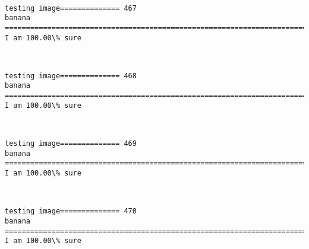 \documentclass[11pt]{article}
\begin{document}
    \begin{center}
    \end{center}
    { \hspace*{\fill} \\}
    
    \begin{Verbatim}[commandchars=\\\{\}]
testing image============== 467
banana
============================================================================
I am 100.00\% sure

    \end{Verbatim}

    \begin{center}
    \end{center}
    { \hspace*{\fill} \\}
    
    \begin{Verbatim}[commandchars=\\\{\}]
testing image============== 468
banana
============================================================================
I am 100.00\% sure

    \end{Verbatim}

    \begin{center}
    \end{center}
    { \hspace*{\fill} \\}
    
    \begin{Verbatim}[commandchars=\\\{\}]
testing image============== 469
banana
============================================================================
I am 100.00\% sure

    \end{Verbatim}

    \begin{center}
    \end{center}
    { \hspace*{\fill} \\}
    
    \begin{Verbatim}[commandchars=\\\{\}]
testing image============== 470
banana
============================================================================
I am 100.00\% sure

    \end{Verbatim}
\end{document}
